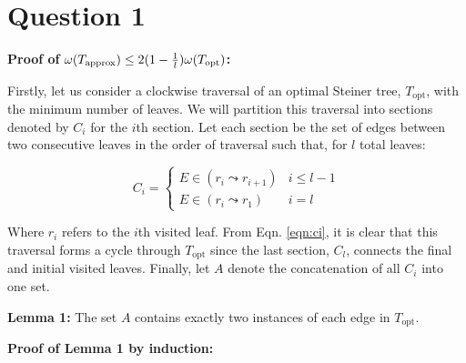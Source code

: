 \section{Question 1}

\textbf{Proof of} $\omega(T_{\text{approx}}) \le 2(1 - {1 \over l})\omega(T_{\text{opt}})$\textbf{:}

Firstly, let us consider a clockwise traversal of an optimal Steiner tree, $T_{\text{opt}}$, with the minimum number of leaves.
We will partition this traversal into sections denoted by $C_i$ for the $i$th section.
Let each section be the set of edges between two consecutive leaves in the order of traversal such that, for $l$ total leaves:

\begin{equation}
    C_i =
    \begin{cases}
        E \in (r_i \leadsto r_{i + 1}) & i \le l - 1 \\
        E \in (r_i \leadsto r_1)       & i = l
    \end{cases}
    \label{eqn:ci}
\end{equation}

Where $r_i$ refers to the $i$th visited leaf.
From Eqn. \ref{eqn:ci}, it is clear that this traversal forms a cycle through $T_{\text{opt}}$ since the last section, $C_l$, connects the final and initial visited leaves.
Finally, let $A$ denote the concatenation of all $C_i$ into one set.\vspace{3mm}

\textbf{Lemma 1:} The set $A$ contains exactly two instances of each edge in $T_{\text{opt}}$.\vspace{3mm}

\textbf{Proof of Lemma 1 by induction:}

